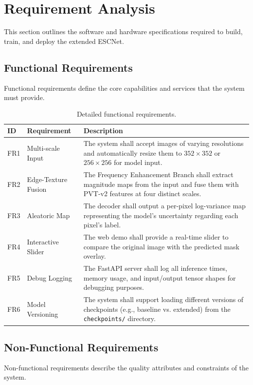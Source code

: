 \documentclass[12pt,a4paper]{report}
\begin{document}
\section{Requirement Analysis}\label{req:analysis}

This section outlines the software and hardware specifications required to build, train, and deploy the extended ESCNet.

\subsection{Functional Requirements}
Functional requirements define the core capabilities and services that the system must provide.

\begin{table}[H]
\centering
\caption{Detailed functional requirements.}
\label{tab:fr}
\begin{tabular}{@{}lp{3cm}p{7.5cm}@{}}
\toprule
\textbf{ID} & \textbf{Requirement} & \textbf{Description} \\
\midrule
FR1 & Multi-scale Input   & The system shall accept images of varying resolutions and automatically resize them to $352 \times 352$ or $256 \times 256$ for model input. \\
FR2 & Edge-Texture Fusion & The Frequency Enhancement Branch shall extract magnitude maps from the input and fuse them with PVT-v2 features at four distinct scales. \\
FR3 & Aleatoric Map       & The decoder shall output a per-pixel log-variance map representing the model's uncertainty regarding each pixel's label. \\
FR4 & Interactive Slider  & The web demo shall provide a real-time slider to compare the original image with the predicted mask overlay. \\
FR5 & Debug Logging       & The FastAPI server shall log all inference times, memory usage, and input/output tensor shapes for debugging purposes. \\
FR6 & Model Versioning    & The system shall support loading different versions of checkpoints (e.g., baseline vs. extended) from the \texttt{checkpoints/} directory. \\
\bottomrule
\end{tabular}
\end{table}

\subsection{Non-Functional Requirements}
Non-functional requirements describe the quality attributes and constraints of the system.
\end{document}
